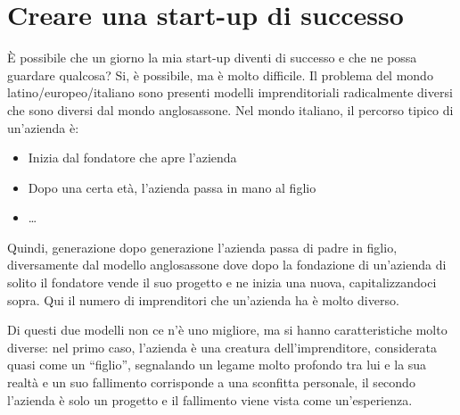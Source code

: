 \section{Creare una start-up di successo}

È possibile che un giorno la mia start-up diventi di successo e che ne possa
guardare qualcosa? Si, è possibile, ma è molto difficile.
Il problema del mondo latino/europeo/italiano sono presenti modelli
imprenditoriali radicalmente diversi che sono diversi dal mondo anglosassone.
Nel mondo italiano, il percorso tipico di un'azienda è:
\begin{itemize}
 \item Inizia dal fondatore che apre l'azienda
 \item Dopo una certa età, l'azienda passa in mano al figlio
 \item \dots
\end{itemize}
Quindi, generazione dopo generazione l'azienda passa di padre in figlio,
diversamente dal modello anglosassone dove dopo la fondazione di
un'azienda di solito il fondatore vende il suo progetto e ne inizia una nuova,
capitalizzandoci sopra. Qui il numero di imprenditori che un'azienda ha è molto
diverso.

Di questi due modelli non ce n'è uno migliore, ma si hanno caratteristiche
molto diverse: nel primo caso, l'azienda è una creatura dell'imprenditore,
considerata quasi come un ``figlio'', segnalando un legame molto profondo tra
lui e la sua realtà e un suo fallimento corrisponde a una sconfitta personale,
il secondo l'azienda è solo un progetto e il fallimento viene vista come
un'esperienza.
